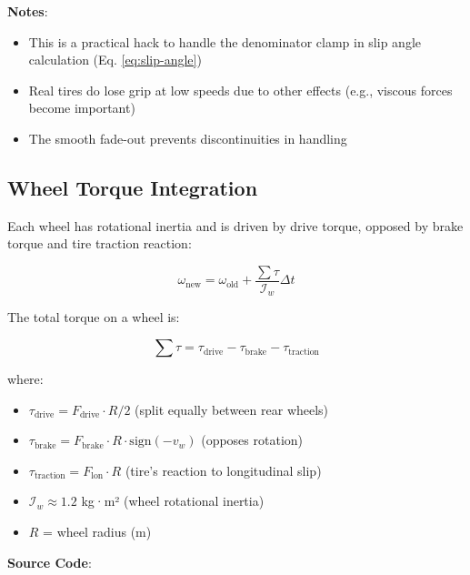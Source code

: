 \textbf{Notes}:
\begin{itemize}
  \item This is a practical hack to handle the denominator clamp in slip angle calculation (Eq. \ref{eq:slip-angle})
  \item Real tires do lose grip at low speeds due to other effects (e.g., viscous forces become important)
  \item The smooth fade-out prevents discontinuities in handling
\end{itemize}

\subsection{Wheel Torque Integration}

Each wheel has rotational inertia and is driven by drive torque, opposed by brake torque and tire traction reaction:

\begin{equation}
  \omega_{\text{new}} = \omega_{\text{old}} + \frac{\sum \tau}{\mathcal{I}_w} \Delta t
  \label{eq:wheel-torque-integration}
\end{equation}

The total torque on a wheel is:

\begin{equation}
  \sum \tau = \tau_{\text{drive}} - \tau_{\text{brake}} - \tau_{\text{traction}}
  \label{eq:wheel-torque-sum}
\end{equation}

where:
\begin{itemize}
  \item $\tau_{\text{drive}} = F_{\text{drive}} \cdot R / 2$ (split equally between rear wheels)
  \item $\tau_{\text{brake}} = F_{\text{brake}} \cdot R \cdot \text{sign}(-v_w)$ (opposes rotation)
  \item $\tau_{\text{traction}} = F_{\text{lon}} \cdot R$ (tire's reaction to longitudinal slip)
  \item $\mathcal{I}_w \approx 1.2$ kg·m² (wheel rotational inertia)
  \item $R$ = wheel radius (m)
\end{itemize}

\textbf{Source Code}: 

